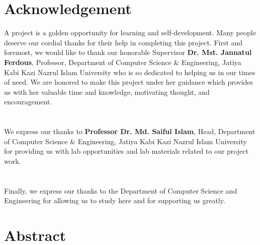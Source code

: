 \documentclass[a4paper, 14pt, openany]{extreport}
\begin{document}
	\chapter*{Acknowledgement}
{\fontsize{16pt}{20pt}\selectfont
	A project is a golden opportunity for learning and self-development. Many people deserve our cordial thanks for their help in completing this project. First and foremost, we would like to thank our honorable Supervisor \textbf{Dr. Mst. Jannatul Ferdous}, Professor, Department of Computer Science \& Engineering, Jatiya Kabi Kazi Nazrul Islam University who is so dedicated to helping us in our times of need. We are honored to make this project under her guidance which provides us with her valuable time and knowledge, motivating thought, and encouragement.
\\
\\
\\
	We express our thanks to \textbf{Professor Dr. Md. Saiful Islam}, Head, Department of Computer Science \& Engineering, Jatiya Kabi Kazi Nazrul Islam University for providing us with lab opportunities and lab materials related to our project work.
\\
\\
\\
	Finally, we express our thanks to the Department of Computer Science and Engineering for allowing us to study here and for supporting us greatly.
}
	\newpage
	\setcounter{secnumdepth}{2}
	\setcounter{tocdepth}{3}
	{
		\setlength{\cftbeforechapskip}{0pt}
		\setlength{\cftbeforesecskip}{2pt}
		\setlength{\cftparskip}{0pt}

		\tableofcontents
		\newpage
		\begingroup\let\addcontentsline\relax\listoffigures\endgroup
		\newpage
		\begingroup\let\addcontentsline\relax\listoftables\endgroup
	}
	
	\clearpage

	
	\chapter{Abstract}
	
\end{document}
